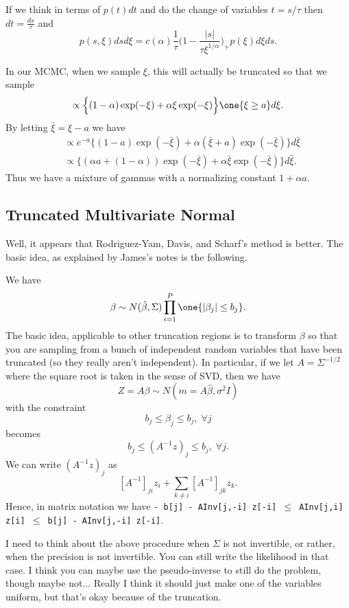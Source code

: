 \documentclass{article}
\begin{document}
If we think in terms of $p(t) dt$ and do the change of variables $t = s / \tau$
then $dt = \frac{ds}{\tau}$ and
\[
p(s, \xi) ds d\xi = c(\alpha) \frac{1}{\tau} \Big(1 - \frac{|s|}{\tau
  \xi^{1/\alpha}}\Big)_+ p(\xi) d \xi d s.
\]

In our MCMC, when we sample $\xi$, this will actually be truncated so that we
sample
\[
\propto \Big\{ (1-\alpha) \exp(-\xi) + \alpha \xi \exp(-\xi) \Big\} \one \{\xi
\geq a \} d\xi.
\]
By letting $\bar \xi = \xi - a$ we have
\begin{align*}
& \propto e^{-a} \Big\{(1-a) \exp(
{-\bar \xi} ) + \alpha (\bar \xi + a) \exp( {-\bar \xi} )
\Big\} d \bar \xi \\
& \propto \Big\{ (\alpha a + (1-\alpha)) \exp(-\bar \xi) + \alpha \bar \xi \exp(-\bar
\xi) \Big\} d \hat \xi.
\end{align*}
Thus we have a mixture of gammas with a normalizing constant $1 + \alpha a$.

\subsection{Truncated Multivariate Normal}

Well, it appears that Rodriguez-Yam, Davis, and Scharf's method is better.  The
basic idea, as explained by James's notes is the following.

We have
\[
\beta \sim N(\hat \beta, \Sigma) \prod_{i=1}^P \one \{|\beta_j| \leq b_j \}.
\]
The basic idea, applicable to other truncation regions is to transform $\beta$
so that you are sampling from a bunch of independent random variables that have
been truncated (so they really aren't independent).  In particular, if we let $A
= \Sigma^{-1/2}$ where the square root is taken in the sense of SVD, then we
have
\[
Z = A\beta \sim N(m = A \hat \beta, \sigma^2 I)
\]
with the constraint
\[
b_j \leq \beta_j \leq b_j, \; \forall j
\]
becomes
\[
b_j \leq (A^{-1} z)_j \leq b_j, \; \forall j.
\]
We can write $(A^{-1} z)_j$ as
\[
[A^{-1}]_{ji} z_i + \sum_{k \neq i} [A^{-1}]_{jk} z_k. 
\]
Hence, in matrix notation we have
\texttt{- b[j] - AInv[j,-i] z[-i] $\leq$ AInv[j,i] z[i] $\leq$ b[j] - AInv[j,-i] z[-i]}.

I need to think about the above procedure when $\Sigma$ is not invertible, or
rather, when the precision is not invertible.  You can still write the
likelihood in that case.  I think you can maybe use the pseudo-inverse to still
do the problem, though maybe not...  Really I think it should just make one of
the variables uniform, but that's okay because of the truncation.
\end{document}
